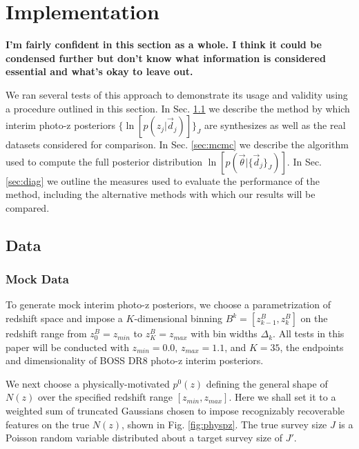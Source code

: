 \documentclass[preprint]{aastex}
\begin{document}
\clearpage
\section{Implementation}
\label{sec:exp}

\textbf{I'm fairly confident in this section as a whole.  I think it could be 
condensed further but don't know what information is considered essential and 
what's okay to leave out.}

We ran several tests of this approach to demonstrate its usage and validity 
using a procedure outlined in this section.  In Sec. \ref{sec:alldata} we 
describe the method by which interim photo-z posteriors 
$\{\ln[p(z_{j}|\vec{d}_{j})]\}_{J}$ are synthesizes as well as the real 
datasets considered for comparison.  In Sec. \ref{sec:mcmc} we describe the 
algorithm used to compute the full posterior distribution 
$\ln[p(\vec{\theta}|\{\vec{d}_{j}\}_{J})]$.  In Sec. \ref{sec:diag} we outline 
the measures used to evaluate the performance of the method, including the 
alternative methods with which our results will be compared.

\clearpage
\subsection{Data}
\label{sec:alldata}

\clearpage
\subsubsection{Mock Data}
\label{sec:mock}

To generate mock interim photo-z posteriors, we choose a parametrization of 
redshift space and impose a $K$-dimensional binning 
$B^{k}=[z^{B}_{k-1},z^{B}_{k}]$ on the redshift range from $z^{B}_{0}=z_{min}$ 
to $z^{B}_{K}=z_{max}$ with bin widths $\Delta_{k}$.  All tests in this paper 
will be conducted with $z_{min}=0.0$, $z_{max}=1.1$, and $K=35$, the endpoints 
and dimensionality of BOSS DR8 photo-z interim posteriors.

We next choose a physically-motivated $p^{0}(z)$ defining the general shape of 
$N(z)$ over the specified redshift range $[z_{min},z_{max}]$.  Here we shall 
set it to a weighted sum of truncated Gaussians chosen to impose recognizably 
recoverable features on the true $N(z)$, shown in Fig. \ref{fig:physpz}.  The 
true survey size $J$ is a Poisson random variable distributed about a target 
survey size of $J'$.
\end{document}
